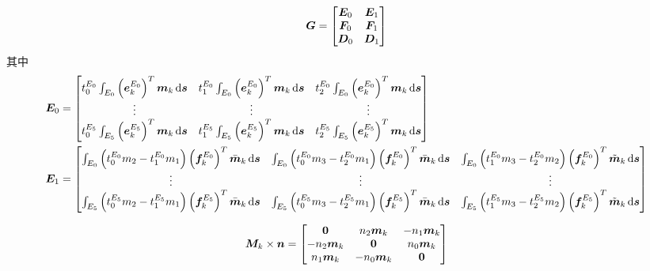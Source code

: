\documentclass{article}
\begin{document}
\begin{align*}
    {\boldsymbol G} = 
    \begin{bmatrix}
        {\boldsymbol E}_0 & {\boldsymbol E}_1 \\
        {\boldsymbol F}_0 & {\boldsymbol F}_1 \\
        {\boldsymbol D}_0 & {\boldsymbol D}_1 
    \end{bmatrix}
\end{align*}
其中
\begin{align*}
    {\boldsymbol E}_0 &= 
    \begin{bmatrix}
        t_0^{E_0}\int_{E_0}
        \left(
        {\boldsymbol e}_k^{E_0}
        \right)^T{\boldsymbol m}_k \,\mathrm d{\boldsymbol s} & 
        t_1^{E_0}\int_{E_0}
        \left(
        {\boldsymbol e}_k^{E_0}
        \right)^T{\boldsymbol m}_k \,\mathrm d{\boldsymbol s} & 
        t_2^{E_0}\int_{E_0}
        \left(
        {\boldsymbol e}_k^{E_0}
        \right)^T{\boldsymbol m}_k \,\mathrm d{\boldsymbol s} \\ 
        \vdots & \vdots & \vdots \\
        t_0^{E_5}\int_{E_5}
        \left(
        {\boldsymbol e}_k^{E_5}
        \right)^T{\boldsymbol m}_k \,\mathrm d{\boldsymbol s} & 
        t_1^{E_5}\int_{E_5}
        \left(
        {\boldsymbol e}_k^{E_5}
        \right)^T{\boldsymbol m}_k \,\mathrm d{\boldsymbol s} & 
        t_2^{E_5}\int_{E_5}
        \left(
        {\boldsymbol e}_k^{E_5}
        \right)^T{\boldsymbol m}_k \,\mathrm d{\boldsymbol s} \\ 
    \end{bmatrix} \\
    {\boldsymbol E}_1 &= 
    \begin{bmatrix}
        \int_{E_0} 
        \left(t_{0}^{E_0}m_2 - t_{1}^{E_0} m_1\right)
        \left({\boldsymbol f}_{k}^{E_0}\right)^T\bar{{\boldsymbol m}}_{k}\,\mathrm d{\boldsymbol s} & 
        \int_{E_0} 
        \left(t_{0}^{E_0}m_3 - t_{2}^{E_0} m_1\right)
        \left({\boldsymbol f}_{k}^{E_0}\right)^T\bar{{\boldsymbol m}}_{k}\,\mathrm d{\boldsymbol s} & 
        \int_{E_0} 
        \left(t_{1}^{E_0}m_3 - t_{2}^{E_0} m_2\right)
        \left({\boldsymbol f}_{k}^{E_0}\right)^T\tilde{{\boldsymbol m}}_{k}\,\mathrm d{\boldsymbol s} \\ 
        \vdots & \vdots & \vdots\\
        \int_{E_5} 
        \left(t_{0}^{E_5}m_2 - t_{1}^{E_5} m_1\right)
        \left({\boldsymbol f}_{k}^{E_5}\right)^T\bar{{\boldsymbol m}}_{k}\,\mathrm d{\boldsymbol s} & 
        \int_{E_5} 
        \left(t_{0}^{E_5}m_3 - t_{2}^{E_5} m_1\right)
        \left({\boldsymbol f}_{k}^{E_5}\right)^T\bar{{\boldsymbol m}}_{k}\,\mathrm d{\boldsymbol s} & 
        \int_{E_5} 
        \left(t_{1}^{E_5}m_3 - t_{2}^{E_5} m_2\right)
        \left({\boldsymbol f}_{k}^{E_5}\right)^T\tilde{{\boldsymbol m}}_{k}\,\mathrm d{\boldsymbol s} \\ 
    \end{bmatrix}
\end{align*}

\begin{align*}
    {\boldsymbol M}_k\times {\boldsymbol n} = 
    \begin{bmatrix}
           \mathbf 0 &  n_2{\boldsymbol m}_k & -n_1{\boldsymbol m}_k\\
        -n_2{\boldsymbol m}_k &   \mathbf 0  &  n_0{\boldsymbol m}_k\\
         n_1{\boldsymbol m}_k & -n_0{\boldsymbol m}_k &  \mathbf 0
    \end{bmatrix}
\end{align*}
\end{document}
